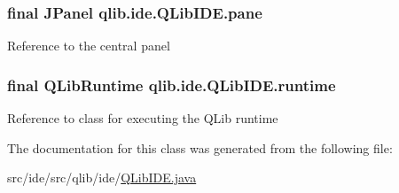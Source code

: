 \subsubsection[{\texorpdfstring{pane}{pane}}]{\setlength{\rightskip}{0pt plus 5cm}final J\+Panel qlib.\+ide.\+Q\+Lib\+I\+D\+E.\+pane\hspace{0.3cm}{\ttfamily [private]}}\hypertarget{classqlib_1_1ide_1_1QLibIDE_a599d44725656f74ca6d6fc028b8973a8}{}\label{classqlib_1_1ide_1_1QLibIDE_a599d44725656f74ca6d6fc028b8973a8}
Reference to the central panel 
\subsubsection[{\texorpdfstring{runtime}{runtime}}]{\setlength{\rightskip}{0pt plus 5cm}final {\bf Q\+Lib\+Runtime} qlib.\+ide.\+Q\+Lib\+I\+D\+E.\+runtime\hspace{0.3cm}{\ttfamily [private]}}\hypertarget{classqlib_1_1ide_1_1QLibIDE_a07b6d9558a76bd5d818a98debdb93d5f}{}\label{classqlib_1_1ide_1_1QLibIDE_a07b6d9558a76bd5d818a98debdb93d5f}
Reference to class for executing the Q\+Lib runtime 

The documentation for this class was generated from the following file\+:\begin{DoxyCompactItemize}
\item 
src/ide/src/qlib/ide/\hyperlink{QLibIDE_8java}{Q\+Lib\+I\+D\+E.\+java}\end{DoxyCompactItemize}
